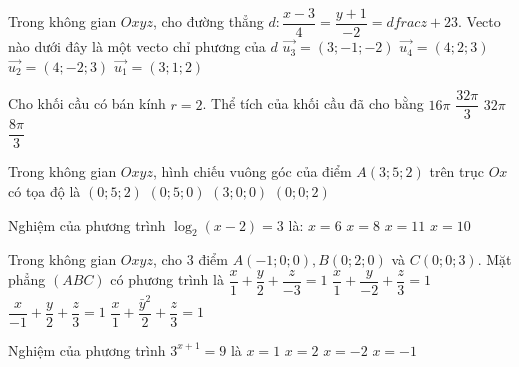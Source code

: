 \begin{ex}%
Trong không gian $O x y z$, cho đường thẳng $d\colon \dfrac{x-3}{4}=\dfrac{y+1}{-2}= dfrac{z+2}{3}$. Vecto nào dưới đây là một vecto chỉ phương của $d$ 
\choice
{$\overrightarrow{u_3}=(3;-1;-2)$}
{$\overrightarrow{u_4}=(4; 2; 3)$}
{\True $\overrightarrow{u_2}=(4;-2; 3)$}
{$\overrightarrow{u_1}=(3; 1; 2)$}

\end{ex}
\begin{ex}%
Cho khối cầu có bán kính $r=2$. Thể tích của khối cầu đã cho bằng
\choice
{$16\pi$}
{\True $\dfrac{32\pi}{3}$}
{$32\pi$}
{$\dfrac{8\pi}{3}$}

\end{ex}
\begin{ex}%
Trong không gian $O x y z$, hình chiếu vuông góc của điểm $A(3; 5; 2)$ trên trục $O x$ có tọa độ là
\choice
{$(0; 5; 2)$}
{$(0; 5; 0)$}
{\True $(3; 0; 0)$}
{$(0; 0; 2)$}

\end{ex}
\begin{ex}%
Nghiệm của phương trình $\log_2(x-2)=3$ là:
\choice
{$x=6$}
{$x=8$}
{$x=11$}
{\True $x=10$}

\end{ex}
\begin{ex}%
{\vspace{-0.5cm}

}

\end{ex}
\begin{ex}%
Trong không gian $O x y z$, cho $3$ điểm $A(-1; 0; 0), B(0; 2; 0)$ và $C(0; 0; 3)$. Mặt phẳng $(ABC)$ có phương trình là
\choice
{$\dfrac{x}{1}+\dfrac{y}{2}+\dfrac{z}{-3}=1$}
{$\dfrac{x}{1}+\dfrac{y}{-2}+\dfrac{z}{3}=1$}
{\True $\dfrac{x}{-1}+\dfrac{y}{2}+\dfrac{z}{3}=1$}
{$\dfrac{x}{1}+\dfrac{\bar{y}^2}{2}+\dfrac{z}{3}=1$}

\end{ex}
\begin{ex}%
Nghiệm của phương trình $3^{x+1}=9$ là
\choice
{\True $x=1$}
{$x=2$}
{$x=-2$}
{$x=-1$}

\end{ex}
